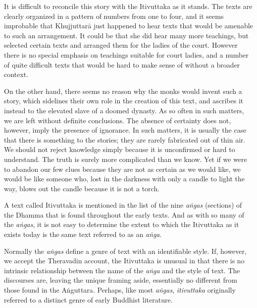 \documentclass[12pt,openany]{book}%
\begin{document}
It is difficult to reconcile this story with the Itivuttaka as it stands. The texts are clearly organized in a pattern of numbers from one to four, and it seems improbable that \textsanskrit{Khujjuttarā} just happened to hear texts that would be amenable to such an arrangement. It could be that she did hear many more teachings, but selected certain texts and arranged them for the ladies of the court. However there is no special emphasis on teachings suitable for court ladies, and a number of quite difficult texts that would be hard to make sense of without a broader context.

On the other hand, there seems no reason why the monks would invent such a story, which sidelines their own role in the creation of this text, and ascribes it instead to the elevated slave of a doomed dynasty. As so often in such matters, we are left without definite conclusions. The absence of certainty does not, however, imply the presence of ignorance. In such matters, it is usually the case that there is something to the stories; they are rarely fabricated out of thin air. We should not reject knowledge simply because it is unconfirmed or hard to understand. The truth is surely more complicated than we know. Yet if we were to abandon our few clues because they are not as certain as we would like, we would be like someone who, lost in the darkness with only a candle to light the way, blows out the candle because it is not a torch.

A text called Itivuttaka is mentioned in the list of the nine \emph{\textsanskrit{aṅgas}} (sections) of the Dhamma that is found throughout the early texts. And as with so many of the \emph{\textsanskrit{aṅgas}}, it is not easy to determine the extent to which the Itivuttaka as it exists today is the same text referred to as an \emph{\textsanskrit{aṅga}}.

Normally the \emph{\textsanskrit{aṅgas}} define a genre of text with an identifiable style. If, however, we accept the Theravadin account, the Itivuttaka is unusual in that there is no intrinsic relationship between the name of the \emph{\textsanskrit{aṅga}} and the style of text. The discourses are, leaving the unique framing aside, essentially no different from those found in the \textsanskrit{Aṅguttara}. Perhaps, like most \emph{\textsanskrit{aṅgas}}, \emph{itivuttaka} originally referred to a distinct genre of early Buddhist literature.
\end{document}
